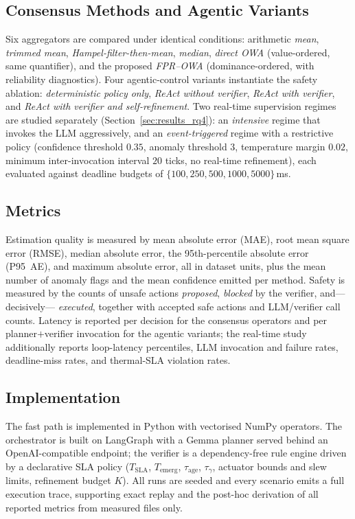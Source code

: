 \documentclass[preprint,11pt]{elsarticle}
\begin{document}
\subsection{Consensus Methods and Agentic Variants}
\label{sec:setup_methods}

Six aggregators are compared under identical conditions: arithmetic
\emph{mean}, \emph{trimmed mean}, \emph{Hampel-filter-then-mean},
\emph{median}, \emph{direct OWA} (value-ordered, same quantifier), and
the proposed \emph{FPR--OWA} (dominance-ordered, with reliability
diagnostics). Four agentic-control variants instantiate the safety
ablation: \emph{deterministic policy only}, \emph{ReAct without
verifier}, \emph{ReAct with verifier}, and \emph{ReAct with verifier and
self-refinement}. Two real-time supervision regimes are studied
separately (Section~\ref{sec:results_rq4}): an \emph{intensive} regime
that invokes the LLM aggressively, and an \emph{event-triggered} regime
with a restrictive policy (confidence threshold $0.35$, anomaly
threshold $3$, temperature margin $0.02$, minimum inter-invocation
interval $20$ ticks, no real-time refinement), each evaluated against
deadline budgets of $\{100,250,500,1000,5000\}$\,ms.

\subsection{Metrics}
\label{sec:setup_metrics}

Estimation quality is measured by mean absolute error (MAE), root mean
square error (RMSE), median absolute error, the 95th-percentile absolute
error (P95~AE), and maximum absolute error, all in dataset units, plus
the mean number of anomaly flags and the mean confidence emitted per
method. Safety is measured by the counts of unsafe actions
\emph{proposed}, \emph{blocked} by the verifier, and---decisively---%
\emph{executed}, together with accepted safe actions and LLM/verifier
call counts. Latency is reported per decision for the consensus
operators and per planner$+$verifier invocation for the agentic
variants; the real-time study additionally reports loop-latency
percentiles, LLM invocation and failure rates, deadline-miss rates, and
thermal-SLA violation rates.

\subsection{Implementation}
\label{sec:setup_impl}

The fast path is implemented in Python with vectorised NumPy operators.
The orchestrator is built on LangGraph with a Gemma planner served behind
an OpenAI-compatible endpoint; the verifier is a dependency-free rule
engine driven by a declarative SLA policy ($T_{\mathrm{SLA}}$,
$T_{\mathrm{emerg}}$, $\tau_{\mathrm{age}}$, $\tau_{\gamma}$, actuator
bounds and slew limits, refinement budget $K$). All runs are seeded and
every scenario emits a full execution trace, supporting exact replay and
the post-hoc derivation of all reported metrics from measured files
only.
\end{document}
